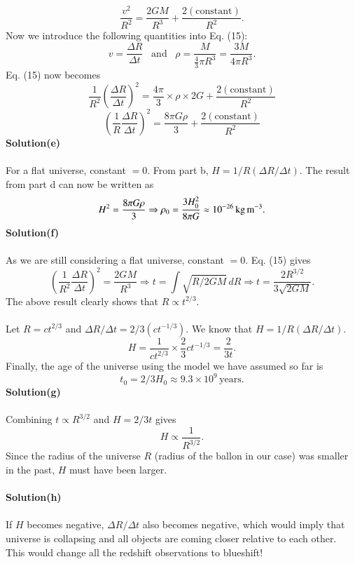 \documentclass[12pt,a4paper]{article}
\begin{document}
\begin{equation}
    \frac{v^2}{R^2}=\frac{2GM}{R^3}+\frac{2(\text{constant})}{R^2}.
\end{equation}
Now we introduce the following quantities into Eq. (15):
\[v=\frac{\Delta R}{\Delta t}\,\,\,\,\,\text{and}\,\,\,\,\,\rho=\frac{M}{\frac{4}{3}\pi R^3}=\frac{3M}{4\pi R^3}.\]
Eq. (15) now becomes
\[\frac{1}{R^2}\left(\frac{\Delta R}{\Delta t}\right)^2=\frac{4\pi}{3}\times\rho\times2G+\frac{2(\text{constant})}{R^2}\]
\[\left(\frac{1}{R}\frac{\Delta R}{\Delta t}\right)^2=\frac{8\pi G\rho}{3}+\frac{2(\text{constant})}{R^2}\]
\textbf{Solution(e)}
\\
\\For a flat universe, constant $=0$. From part b, $H=1/R(\Delta R/\Delta t)$. The result from part d can now be written as
\[H^2=\frac{8\pi G\rho}{3}\Rightarrow\rho_0=\frac{3H_0^2}{8\pi G}\approx10^{-26}\,\text{kg\,m}^{-3}.\]
\textbf{Solution(f)}
\\
\\As we are still considering a flat universe, constant $=0$. Eq. (15) gives 
\[\left(\frac{1}{R^2}\frac{\Delta R}{\Delta t}\right)^2=\frac{2GM}{R^3}\Rightarrow t=\int\sqrt{R/2GM}\,dR\Rightarrow t=\frac{2R^{3/2}}{3\sqrt{2GM}}.\]
The above result clearly shows that $R\propto t^{2/3}$. 
\\
\\Let $R=ct^{2/3}$ and $\Delta R/\Delta t=2/3(ct^{-1/3})$. We know that $H=1/R(\Delta R/\Delta t)$. 
\[H=\frac{1}{ct^{2/3}}\times\frac{2}{3}ct^{-1/3}=\frac{2}{3t}.\]
Finally, the age of the universe using the model we have assumed so far is
\[t_0=2/3H_0\approx9.3\times10^9\,\text{years}.\]
\textbf{Solution(g)}
\\
\\Combining $t\propto R^{3/2}$ and $H=2/3t$ gives
\[H\propto\frac{1}{R^{3/2}}.\]
Since the radius of the universe $R$ (radius of the ballon in our case) was smaller in the past, $H$ must have been larger.
\\
\\\textbf{Solution(h)}
\\
\\If $H$ becomes negative, $\Delta R/\Delta t$ also becomes negative, which would imply that universe is collapsing and all objects are coming closer relative to each other. This would change all the redshift observations to blueshift!
\end{document}
